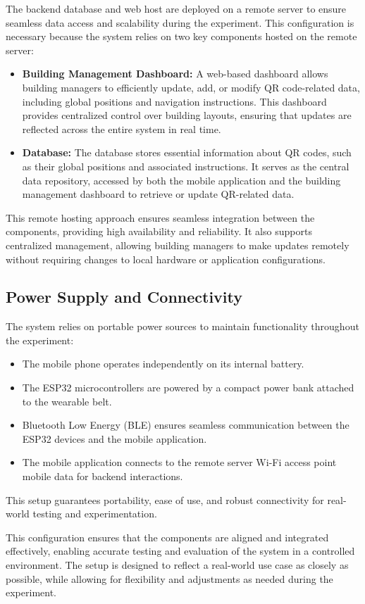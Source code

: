The backend database and web host are deployed on a remote server to ensure seamless data access and scalability during the experiment. This configuration is necessary because the system relies on two key components hosted on the remote server:

\begin{itemize}
	\item \textbf{Building Management Dashboard:} A web-based dashboard allows building managers to efficiently update, add, or modify QR code-related data, including global positions and navigation instructions. This dashboard provides centralized control over building layouts, ensuring that updates are reflected across the entire system in real time.
	\item \textbf{Database:} The database stores essential information about QR codes, such as their global positions and associated instructions. It serves as the central data repository, accessed by both the mobile application and the building management dashboard to retrieve or update QR-related data.
\end{itemize}

This remote hosting approach ensures seamless integration between the components, providing high availability and reliability. It also supports centralized management, allowing building managers to make updates remotely without requiring changes to local hardware or application configurations.


\subsection{Power Supply and Connectivity}

The system relies on portable power sources to maintain functionality throughout the experiment:
\begin{itemize}
	\item The mobile phone operates independently on its internal battery.
	\item The ESP32 microcontrollers are powered by a compact power bank attached to the wearable belt.
	\item Bluetooth Low Energy (BLE) ensures seamless communication between the ESP32 devices and the mobile application.
	\item The mobile application connects to the remote server Wi-Fi access point mobile data for backend interactions.
\end{itemize}

This setup guarantees portability, ease of use, and robust connectivity for real-world testing and experimentation.


This configuration ensures that the components are aligned and integrated effectively, enabling accurate testing and evaluation of the system in a controlled environment. The setup is designed to reflect a real-world use case as closely as possible, while allowing for flexibility and adjustments as needed during the experiment.
